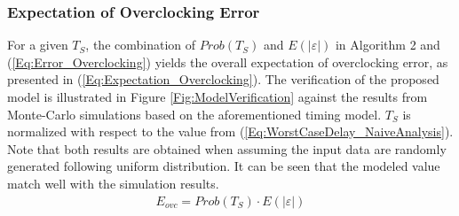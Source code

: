 \documentclass{acm_proc_article-sp}
\begin{document}
\subsubsection{Expectation of Overclocking Error}
For a given $T_S$, the combination of $Prob(T_S)$ and $E(|\varepsilon|)$ in Algorithm 2 and (\ref{Eq:Error_Overclocking}) yields the overall expectation of overclocking error, as presented in (\ref{Eq:Expectation_Overclocking}). The verification of the proposed model is illustrated in Figure \ref{Fig:ModelVerification} against the results from Monte-Carlo simulations based on the aforementioned timing model. $T_S$ is normalized with respect to the value from (\ref{Eq:WorstCaseDelay_NaiveAnalysis}). Note that both results are obtained when assuming the input data are randomly generated following uniform distribution. It can be seen that the modeled value match well with the simulation results.
%
\begin{eqnarray}\label{Eq:Expectation_Overclocking}
  E_{ovc}=Prob(T_S)\cdot E(|\varepsilon|)
\end{eqnarray}
\end{document}
